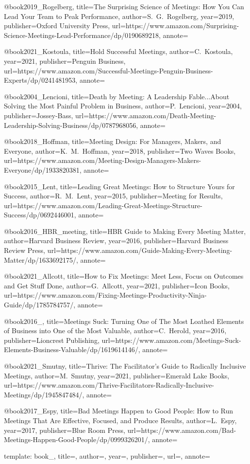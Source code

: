 @book{2019_Rogelberg,
title={The Surprising Science of Meetings: How You Can Lead Your Team to Peak Performance},
author={S.~G.~Rogelberg},
year={2019},
publisher={Oxford University Press},
url={https://www.amazon.com/Surprising-Science-Meetings-Lead-Performance/dp/0190689218},
annote={}
}

@book{2021_Kostoula,
title={Hold Successful Meetings},
author={C.~Kostoula},
year={2021},
publisher={Penguin Business},
url={https://www.amazon.com/Successful-Meetings-Penguin-Business-Experts/dp/0241481953},
annote={}
}

@book{2004_Lencioni,
title={Death by Meeting: A Leadership Fable...About Solving the Most Painful Problem in Business},
author={P.~Lencioni},
year={2004},
publisher={Jossey-Bass},
url={https://www.amazon.com/Death-Meeting-Leadership-Solving-Business/dp/0787968056},
annote={}
}

@book{2018_Hoffman,
title={Meeting Design: For Managers, Makers, and Everyone},
author={K.~M.~Hoffman},
year={2018},
publisher={Two Waves Books},
url={https://www.amazon.com/Meeting-Design-Managers-Makers-Everyone/dp/1933820381},
annote={}
}

@book{2015_Lent,
title={Leading Great Meetings: How to Structure Yours for Success},
author={R.~M.~Lent},
year={2015},
publisher={Meeting for Results},
url={https://www.amazon.com/Leading-Great-Meetings-Structure-Success/dp/0692446001},
annote={}
}

@book{2016_HBR_meeting,
title={HBR Guide to Making Every Meeting Matter},
author={Harvard Business Review},
year={2016},
publisher={Harvard Business Review Press},
url={https://www.amazon.com/Guide-Making-Every-Meeting-Matter/dp/1633692175/},
annote={}
}

@book{2021_Allcott,
title={How to Fix Meetings: Meet Less, Focus on Outcomes and Get Stuff Done},
author={G.~Allcott},
year={2021},
publisher={Icon Books},
url={https://www.amazon.com/Fixing-Meetings-Productivity-Ninja-Guide/dp/1785784757/},
annote={}
}

@book{2016_,
title={Meetings Suck: Turning One of The Most Loathed Elements of Business into One of the Most Valuable},
author={C.~Herold},
year={2016},
publisher={Lioncrest Publishing},
url={https://www.amazon.com/Meetings-Suck-Elements-Business-Valuable/dp/1619614146/},
annote={}
}

@book{2021_Smutny,
title={Thrive: The Facilitator’s Guide to Radically Inclusive Meetings},
author={M.~Smutny},
year={2021},
publisher={Emerald Lake Books},
url={https://www.amazon.com/Thrive-Facilitators-Radically-Inclusive-Meetings/dp/1945847484/},
annote={}
}

@book{2017_Espy,
title={Bad Meetings Happen to Good People: How to Run Meetings That Are Effective, Focused, and Produce Results},
author={L.~Espy},
year={2017},
publisher={Blue Room Press},
url={https://www.amazon.com/Bad-Meetings-Happen-Good-People/dp/0999326201/},
annote={}
}





template:
book{_,
title={},
author={},
year={},
publisher={},
url={},
annote={}
}
